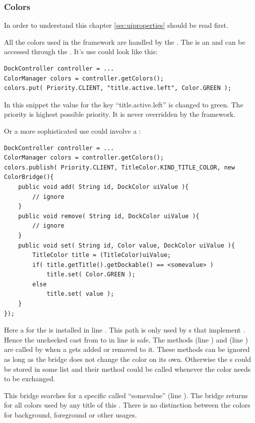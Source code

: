 \subsubsection{Colors}
In order to understand this chapter \ref{sec:uiproperties} should be read first.

All the colors used in the framework are handled by the . The  is an  and can be accessed through the \linebreak {}. It's use could look like this:
\begin{lstlisting}
DockController controller = ...
ColorManager colors = controller.getColors();
colors.put( Priority.CLIENT, "title.active.left", Color.GREEN );
\end{lstlisting}
In this snippet the value for the key ``title.active.left'' is changed to green. The priority  is highest possible priority. It is never overridden by the framework.

Or a more sophisticated use could involve a :
\begin{lstlisting}
DockController controller = ...
ColorManager colors = controller.getColors();
colors.publish( Priority.CLIENT, TitleColor.KIND_TITLE_COLOR, new ColorBridge(){
	public void add( String id, DockColor uiValue ){
		// ignore
	}
	public void remove( String id, DockColor uiValue ){
		// ignore
	}
	public void set( String id, Color value, DockColor uiValue ){
		TitleColor title = (TitleColor)uiValue;
		if( title.getTitle().getDockable() == <somevalue> )
			title.set( Color.GREEN );
		else
			title.set( value );
	}	
});
\end{lstlisting}
Here a  for the   is installed in line . This path is only used by s that implement . Hence the unchecked cast from  to  in line  is safe. The methods  (line ) and  (line ) are called by  when a  gets added or removed to it. These methods can be ignored as long as the bridge does not change the color on its own. Otherwise the s could be stored in some list and their method  could be called whenever the color needs to be exchanged.

This bridge searches for a specific  called ``somevalue'' (line ). The bridge returns  for all colors used by any title of this . There is no distinction between the colors for background, foreground or other usages.

